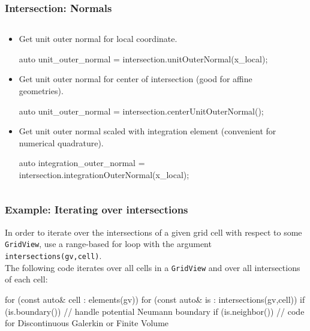 \documentclass[aspectratio=169,11pt]{beamer}
\theoremstyle{definition}
\begin{document}
\begin{frame}[fragile] \frametitle{Intersection: Normals}
  \begin{columns}
    \begin{column}{0.75\linewidth}
      \begin{itemize}
      \item Get unit outer normal for local coordinate.
        \begin{cppcode}
auto unit_outer_normal =
    intersection.unitOuterNormal(x_local);
        \end{cppcode}
      \item Get unit outer normal for center of intersection (good for affine geometries).
        \begin{cppcode}
auto unit_outer_normal =
    intersection.centerUnitOuterNormal();
        \end{cppcode}
      \item Get unit outer normal scaled with integration element (convenient for numerical quadrature).
        \begin{cppcode}
auto integration_outer_normal =
    intersection.integrationOuterNormal(x_local);
        \end{cppcode}
      \end{itemize}
    \end{column}
 \begin{column}{0.25\linewidth}
   \begin{center}
     \intersections{}
      \end{center}
    \end{column}
  \end{columns}

\end{frame}



\begin{frame}[fragile] \frametitle{Example: Iterating over intersections}
In order to iterate over the intersections of a given grid cell with respect to some
\lstinline!GridView!, use a range-based for loop with the argument \lstinline!intersections(gv,cell)!.\\[.5em]
The following code iterates over all cells in a \lstinline!GridView! and over all intersections of each cell:
\begin{cppcode}
for (const auto& cell : elements(gv))
  for (const auto& is : intersections(gv,cell)) {
    if (is.boundary()) {
      // handle potential Neumann boundary
    }
    if (is.neighbor()) {
      // code for Discontinuous Galerkin or Finite Volume
    }
  }
\end{cppcode}
\end{frame}
\end{document}
